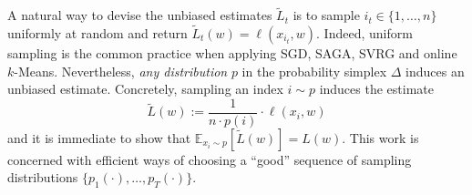  A natural way to devise the unbiased estimates $\tilde{L}_t$ is to sample $i_t \in \{ 1, \dots, n\}$ uniformly at random and return $\tilde{L}_t(w) = \ell(x_{i_t},w)$. Indeed, uniform sampling is the common practice when applying SGD, SAGA, SVRG and online $k$-Means. Nevertheless, \emph{any distribution} $p$ in the probability simplex $\Delta$ induces an unbiased estimate.
 Concretely, sampling an index $i \sim p$  induces the estimate
  \begin{equation}
  \tilde{L}(w) := \frac{1}{n \cdot p(i)} \cdot  \ell (x_i, w)
\end{equation}
and it is immediate to show that $\mathbb{E}_{x_i\sim p}[\tilde{L}(w)]=L(w)$.
This work is concerned with efficient ways of choosing a ``good'' sequence of sampling distributions $\{p_1(\cdot),\ldots, p_T(\cdot)\}$.

